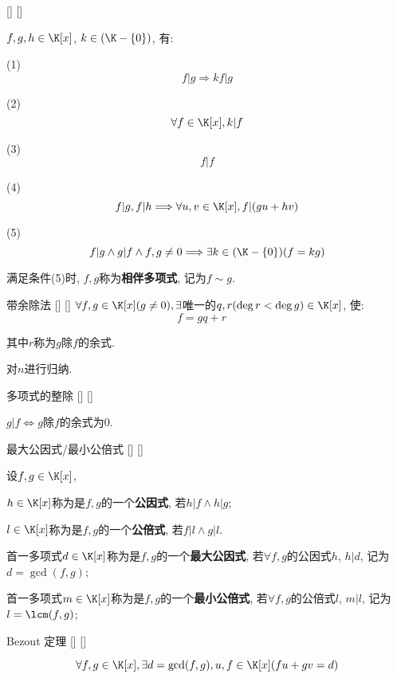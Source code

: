 \documentclass[UTF8]{ctexart}
\begin{document}
		\begin{ppt}
			[]
			{}
			[]
			[]
			
			$f,g,h\in\K[x]$, $k\in(\K-\{0\})$, 有: 
			
			(1)\[f|g\Longrightarrow kf|g\]

			(2)\[\forall f\in\K[x], k|f\]

			(3)\[f|f\]

			(4)\[f|g,f|h\Longrightarrow\forall u,v\in\K[x], f|(gu+hv)\]

			(5)\[f|g\wedge g|f\wedge f,g\neq 0\Longrightarrow\exists k\in(\K-\{0\})(f=kg)\]

			满足条件(5)时, $f,g$称为\textbf{相伴多项式}, 记为$f\sim g$. 
		\end{ppt}

		\begin{thm}
			[]
			{带余除法}
			[]
			[]
			$\forall f,g\in\K[x](g\neq 0), \exists$唯一的$q,r(\deg r<\deg g)\in\K[x]$, 使: 
			\[f=gq+r\quad\]

			其中$r$称为$g$除$f$的余式. 
		\end{thm}
  
        \begin{prf}
			对$n$进行归纳. 
        \end{prf}
        
		\begin{ppt}
			[]
			{多项式的整除}
			[]
			[]

			$g|f\iff g$除$f$的余式为$0$. 
		\end{ppt}
		
		\begin{dfn}
			[]
			{最大公因式/最小公倍式}
			[]
			[]

			设$f,g\in\K[x]$, 
			
			$h\in\K[x]$称为是$f,g$的一个\textbf{公因式}, 若$h|f\wedge h|g$; 
			
			$l\in\K[x]$称为是$f,g$的一个\textbf{公倍式}, 若$f|l\wedge g|l$. 

			首一多项式$d\in\K[x]$称为是$f,g$的一个\textbf{最大公因式}, 若$\forall f,g$的公因式$h$, $h|d$, 记为$d=\gcd(f,g)$; 

			首一多项式$m\in\K[x]$称为是$f,g$的一个\textbf{最小公倍式}, 若$\forall f,g$的公倍式$l$, $m|l$, 记为$l=\lcm(f,g)$; 
		\end{dfn}
		
		\begin{thm}
			[]
			{Bezout 定理}
			[]
			[]

			\[\forall f,g\in\K[x], \exists d=\gcd(f,g), u,f\in\K[x](fu+gv=d)\]
		\end{thm}
		
\end{document}
